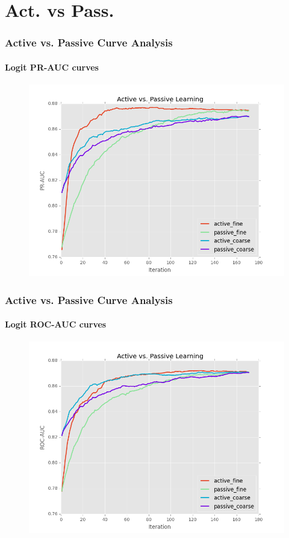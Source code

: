 \documentclass{beamer}
\begin{document}
\section{Act. vs Pass.}
\begin{frame}
    \frametitle{Active vs. Passive Curve Analysis}  %
    \framesubtitle{Logit PR-AUC curves}
    \begin{figure}[!htb]
        \centering
        \includegraphics[width=0.80\columnwidth]{fig/runActPassLogReg_pr}
    \label{fig:runActPassLogReg_pr}
    \end{figure}
\end{frame}
\begin{frame}
    \frametitle{Active vs. Passive Curve Analysis}  %
    \framesubtitle{Logit ROC-AUC curves}
    \begin{figure}[!htb]
        \centering
        \includegraphics[width=0.80\columnwidth]{fig/runActPassLogReg_roc}
    \label{fig:runActPassLogReg_roc}
    \end{figure}
\end{frame}
\end{document}
